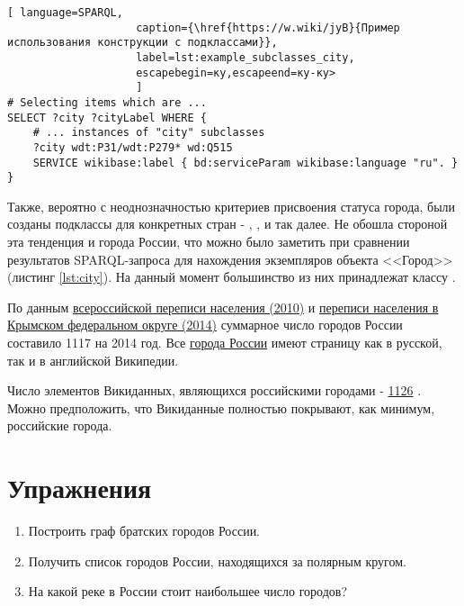 \begin{lstlisting}[ language=SPARQL, 
                    caption={\href{https://w.wiki/jyB}{Пример использования конструкции с подклассами}},
                    label=lst:example_subclasses_city, 
                    escapebegin=ку,escapeend=ку-ку>
                    ]
# Selecting items which are ...
SELECT ?city ?cityLabel WHERE {
	# ... instances of "city" subclasses 
	?city wdt:P31/wdt:P279* wd:Q515
	SERVICE wikibase:label { bd:serviceParam wikibase:language "ru". }
}
\end{lstlisting}

Также, вероятно с неоднозначностью критериев присвоения статуса города, были созданы подклассы для конкретных стран - , ,  и так далее. Не обошла стороной эта тенденция и города России, что можно было заметить при сравнении результатов SPARQL-запроса для нахождения экземпляров объекта <<Город>> (листинг \ref{lst:city}). На данный момент большинство из них принадлежат классу .

По данным \href{http://www.gks.ru/free_doc/new_site/perepis2010/croc/Documents/Vol1/pub-01-03.pdf}{всероссийской переписи населения (2010)} и \href{https://rosstat.gov.ru/free_doc/new_site/population/demo/perepis_krim/KRUM_2015.pdf}{переписи населения в Крымском федеральном округе (2014)} суммарное число городов России составило \num{1117} на 2014 год. Все \href{https://ru.m.wikipedia.org/wiki/Список_городов_России}{города России} имеют страницу как в русской, так и в английской Википедии.

Число элементов Викиданных, являющихся российскими городами - \href{https://w.wiki/jyP}{1126} . Можно предположить, что Викиданные полностью покрывают, как минимум, российские города. 

\section{Упражнения}
\begin{enumerate}
\item Построить граф братских городов России.
\item Получить список городов России, находящихся за полярным кругом.
\item На какой реке в России стоит наибольшее число городов?
\end{enumerate}